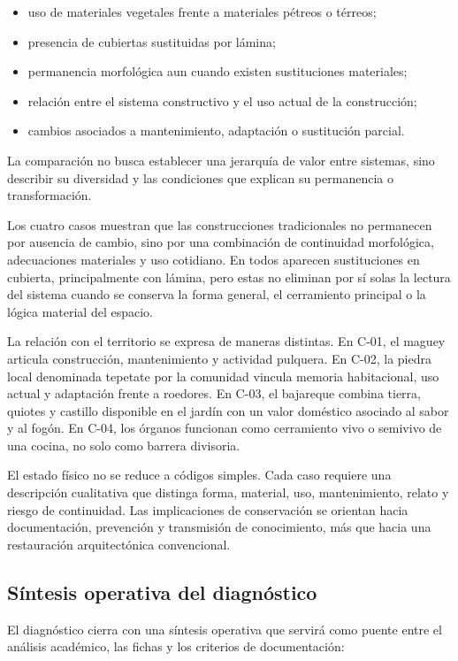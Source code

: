 \begin{itemize}
	\item uso de materiales vegetales frente a materiales pétreos o térreos;
	\item presencia de cubiertas sustituidas por lámina;
	\item permanencia morfológica aun cuando existen sustituciones materiales;
	\item relación entre el sistema constructivo y el uso actual de la construcción;
	\item cambios asociados a mantenimiento, adaptación o sustitución parcial.
\end{itemize}

La comparación no busca establecer una jerarquía de valor entre sistemas, sino describir su diversidad y las condiciones que explican su permanencia o transformación.

Los cuatro casos muestran que las construcciones tradicionales no permanecen por ausencia de cambio, sino por una combinación de continuidad morfológica, adecuaciones materiales y uso cotidiano. En todos aparecen sustituciones en cubierta, principalmente con lámina, pero estas no eliminan por sí solas la lectura del sistema cuando se conserva la forma general, el cerramiento principal o la lógica material del espacio.

La relación con el territorio se expresa de maneras distintas. En C-01, el maguey articula construcción, mantenimiento y actividad pulquera. En C-02, la piedra local denominada tepetate por la comunidad vincula memoria habitacional, uso actual y adaptación frente a roedores. En C-03, el bajareque combina tierra, quiotes y castillo disponible en el jardín con un valor doméstico asociado al sabor y al fogón. En C-04, los órganos funcionan como cerramiento vivo o semivivo de una cocina, no solo como barrera divisoria.

El estado físico no se reduce a códigos simples. Cada caso requiere una descripción cualitativa que distinga forma, material, uso, mantenimiento, relato y riesgo de continuidad. Las implicaciones de conservación se orientan hacia documentación, prevención y transmisión de conocimiento, más que hacia una restauración arquitectónica convencional.

\subsection{Síntesis operativa del diagnóstico}

El diagnóstico cierra con una síntesis operativa que servirá como puente entre el análisis académico, las fichas y los criterios de documentación:

